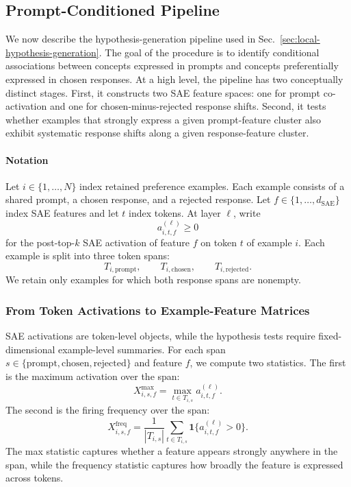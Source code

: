 \documentclass{article} %
\begin{document}
\clearpage
\subsection{Prompt-Conditioned Pipeline}
\label{app:prompt-conditioned-response-shifts}

We now describe the hypothesis-generation pipeline used in Sec.~\ref{sec:local-hypothesis-generation}. The goal of the procedure is to identify conditional associations between concepts expressed in prompts and concepts preferentially expressed in chosen responses. At a high level, the pipeline has two conceptually distinct stages. First, it constructs two SAE feature spaces: one for prompt co-activation and one for chosen-minus-rejected response shifts. Second, it tests whether examples that strongly express a given prompt-feature cluster also exhibit systematic response shifts along a given response-feature cluster.

\paragraph{Notation}
\label{app:pcfs-notation}

Let $i \in \{1,\ldots,N\}$ index retained preference examples. Each example consists of a shared prompt, a chosen response, and a rejected response. Let $f \in \{1,\ldots,d_{\text{SAE}}\}$ index SAE features and let $t$ index tokens. At layer $\ell$, write
\begin{equation}
a^{(\ell)}_{i,t,f} \geq 0
\end{equation}
for the post-top-$k$ SAE activation of feature $f$ on token $t$ of example $i$. Each example is split into three token spans:
\begin{equation}
T_{i,\text{prompt}}, \qquad T_{i,\text{chosen}}, \qquad T_{i,\text{rejected}}.
\end{equation}
We retain only examples for which both response spans are nonempty.

\subsubsection{From Token Activations to Example-Feature Matrices}
\label{app:pcfs-example-feature-matrices}

SAE activations are token-level objects, while the hypothesis tests require fixed-dimensional example-level summaries. For each span $s \in \{\text{prompt},\text{chosen},\text{rejected}\}$ and feature $f$, we compute two statistics. The first is the maximum activation over the span:
\begin{equation}
X^{\max}_{i,s,f} = \max_{t \in T_{i,s}} a^{(\ell)}_{i,t,f}.
\end{equation}
The second is the firing frequency over the span:
\begin{equation}
X^{\text{freq}}_{i,s,f} = \frac{1}{|T_{i,s}|}\sum_{t \in T_{i,s}}\mathbf{1}\{a^{(\ell)}_{i,t,f} > 0\}.
\end{equation}
The max statistic captures whether a feature appears strongly anywhere in the span, while the frequency statistic captures how broadly the feature is expressed across tokens.
\end{document}
